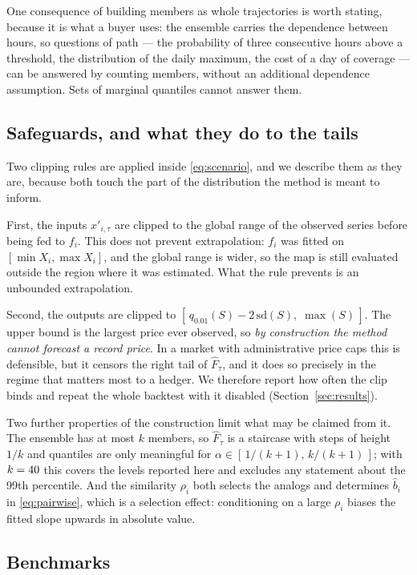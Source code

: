\documentclass[12pt,a4paper]{article}
\begin{document}
One consequence of building members as whole trajectories is worth stating,
because it is what a buyer uses: the ensemble carries the dependence between
hours, so questions of path — the probability of three consecutive hours above
a threshold, the distribution of the daily maximum, the cost of a day of
coverage — can be answered by counting members, without an additional
dependence assumption. Sets of marginal quantiles cannot answer them.

\subsection{Safeguards, and what they do to the tails}
\label{sec:safeguards}

Two clipping rules are applied inside \eqref{eq:scenario}, and we describe
them as they are, because both touch the part of the distribution the method
is meant to inform.

First, the inputs $x'_{i,\tau}$ are clipped to the global range of the
observed series before being fed to $f_i$. This does not prevent
extrapolation: $f_i$ was fitted on $[\min X_i,\max X_i]$, and the global range
is wider, so the map is still evaluated outside the region where it was
estimated. What the rule prevents is an unbounded extrapolation.

Second, the outputs are clipped to
$[\,q_{0.01}(S)-2\,\mathrm{sd}(S),\;\max(S)\,]$. The upper bound is the
largest price ever observed, so \emph{by construction the method cannot
forecast a record price}. In a market with administrative price caps this is
defensible, but it censors the right tail of $\hat F_\tau$, and it does so
precisely in the regime that matters most to a hedger. We therefore report
how often the clip binds and repeat the whole backtest with it disabled
(Section~\ref{sec:results}).

Two further properties of the construction limit what may be claimed from it.
The ensemble has at most $k$ members, so $\hat F_\tau$ is a staircase with
steps of height $1/k$ and quantiles are only meaningful for
$\alpha\in[\,1/(k+1),\,k/(k+1)\,]$; with $k=40{}$ this covers the
levels reported here and excludes any statement about the 99th percentile.
And the similarity $\rho_i$ both selects the analogs and determines
$\hat b_i$ in \eqref{eq:pairwise}, which is a selection effect: conditioning
on a large $\rho_i$ biases the fitted slope upwards in absolute value.

\subsection{Benchmarks}
\end{document}
